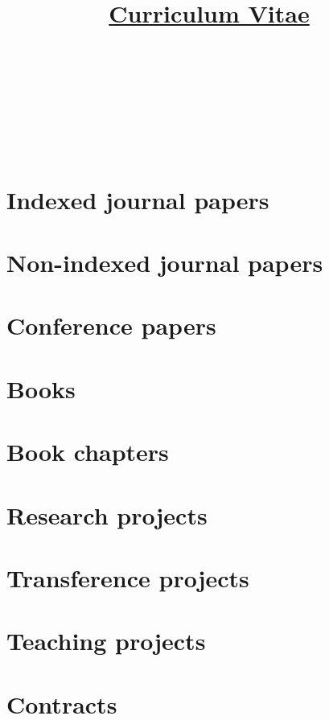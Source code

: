 \documentclass{article}
\title{\href{https://github.com/vicente-gonzalez-ruiz/ridiculum}{Curriculum Vitae}}
\author{
  \begin{tabular}{c}
      \\
    ~\\
     \\
     \\
     \\
     \\
    ~\\
     \\
    
  \end{tabular}
}
\begin{document}
\maketitle

\tableofcontents

\renewcommand{\refname}{}
\section{Indexed journal papers}


\section{Non-indexed journal papers}


\renewcommand{\refname}{}
\section{Conference papers}


\renewcommand{\refname}{}
\section{Books}


\renewcommand{\refname}{}
\section{Book chapters}


\renewcommand{\refname}{}
\section{Research projects}


\renewcommand{\refname}{}
\section{Transference projects}


\renewcommand{\refname}{}
\section{Teaching projects}


\renewcommand{\refname}{}
\section{Contracts}

\end{document}
